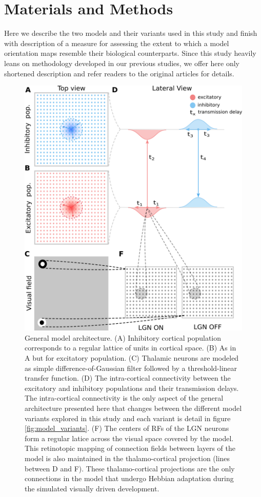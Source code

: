 \documentclass[utf8]{frontiersSCNS}
\begin{document}
\section{Materials and Methods}

Here we describe the two models and their variants used in this study and finish with description of a measure
for assessing the extent to which a model orientation maps resemble their biological counterparts. Since this study heavily leans on methodology 
developed in our previous studies, we offer here only shortened description and refer readers to the original articles for details.


\begin{figure}[htpb!] 
\centering
\includegraphics[width=16cm]{./SVG/FigureModelArchitecture/drawing.png}
\caption{General model architecture. (A) Inhibitory cortical population corresponds to a regular lattice of units in cortical space. (B) As in A but 
for excitatory population. (C) Thalamic neurons are modeled as simple difference-of-Gaussian filter followed by a threshold-linear transfer function. 
(D) The intra-cortical connectivity between the excitatory and inhibitory populations and their transmission delays. The intra-cortical connectivity is the only aspect of the general architecture presented here that changes between the different model variants explored in this study and each variant is detail in figure \ref{fig:model_variants}.
(F) The centers of RFs of the LGN neurons form a regular latice across the visual space covered by the model. This retinotopic mapping of connection fields between layers of the model is also maintained in the thalamo-cortical projection (lines between D and F). These thalamo-cortical projections are the only connections in the model that undergo Hebbian adaptation during the simulated visually driven development.}
\label{fig:model_architecture}
\end{figure} 
\end{document}
